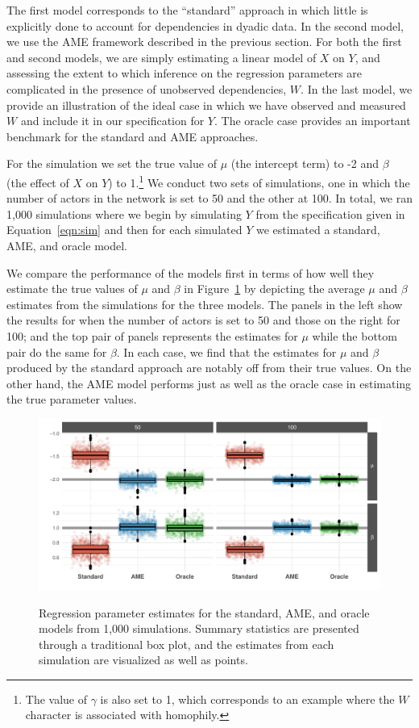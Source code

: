 The first model corresponds to the ``standard'' approach in which little is explicitly done to account for dependencies in dyadic data. In the second model, we use the AME framework described in the previous section. For both the first and second models, we are simply estimating a linear model of $X$ on $Y$, and assessing the extent to which inference on the regression parameters are complicated in the presence of unobserved dependencies, $W$. In the last model, we provide an illustration of the ideal case in which we have observed and measured $W$ and include it in our specification for $Y$. The oracle case provides an important benchmark for the standard and AME approaches.

For the simulation we set the true value of $\mu$ (the intercept term) to -2 and $\beta$ (the effect of $X$ on $Y$) to 1.\footnote{The value of $\gamma$ is also set to 1, which corresponds to an example where the $W$ character is associated with homophily.} We conduct two sets of simulations, one in which the number of actors in the network is set to 50 and the other at 100. In total, we ran 1,000 simulations where we begin by simulating $Y$ from the specification given in Equation~\ref{eqn:sim} and then for each simulated $Y$ we estimated a standard, AME, and oracle model. 

We compare the performance of the models first in terms of how well they estimate the true values of $\mu$ and $\beta$ in Figure~\ref{fig:ameBias} by depicting the average $\mu$ and $\beta$ estimates from the simulations for the three models. The panels in the left show the results for when the number of actors is set to 50 and those on the right for 100; and the top pair of panels represents the estimates for $\mu$ while the bottom pair do the same for $\beta$. In each case, we find that the estimates for $\mu$ and $\beta$ produced by the standard approach are notably off from their true values. On the other hand, the AME model performs just as well as the oracle case in estimating the true parameter values. 

\begin{figure}
	\centering
	\caption{Regression parameter estimates for the standard, AME, and oracle models from 1,000 simulations. Summary statistics are presented through a traditional box plot, and the estimates from each simulation are visualized as well as points.}
	\label{fig:ameBias}
	\includegraphics[width=1\textwidth]{graphics/ameSimBias_all.pdf} \\
\end{figure}

